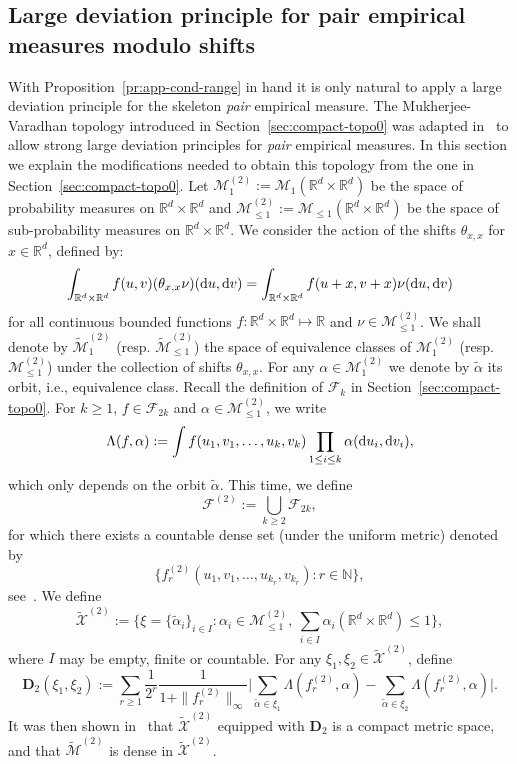 \documentclass[a4paper,11pt]{amsart}
\numberwithin{equation}{section}
\newcommand{\bbN}{{\ensuremath{\mathbb N}} }
\newcommand{\bbR}{{\ensuremath{\mathbb R}} }
\newcommand{\cF}{{\ensuremath{\mathcal F}} }
\newcommand{\cM}{{\ensuremath{\mathcal M}} }
\newcommand{\cX}{{\ensuremath{\mathcal X}} }
\newcommand{\ga}{\alpha}
\newcommand{\gt}{\theta}
\newcommand{\gL}{\Lambda}
\renewcommand{\tilde}{\widetilde}          %
\newcommand{\dd}{\text{\rm d}}             %
\newcommand{\8}{\infty}
\newcommand{\beq}{\begin{equation}}
\newcommand{\eeq}{\end{equation}}
\begin{document}
\subsection{Large deviation principle for pair empirical measures modulo shifts} 
\label{sec:pairLDP}
With Proposition~\ref{pr:app-cond-range} in hand it is only natural to apply a large deviation principle for the skeleton {\it pair} empirical measure. The Mukherjee-Varadhan topology introduced in Section~\ref{sec:compact-topo0} was adapted in~\cite{EP23} to allow strong large deviation principles for {\it pair} empirical measures. In this section we explain the modifications needed to obtain this topology from the one in Section~\ref{sec:compact-topo0}.
\noindent
Let $\cM_1^{(2)} := \cM_1(\bbR^d\times \bbR^d)$ be the space of probability measures on $\bbR^d\times \bbR^d$ and $\cM_{\le1}^{(2)} := \cM_{\le1}(\bbR^d\times \bbR^d)$ be the space of sub-probability measures on $\bbR^d\times \bbR^d$. We consider the action of the shifts $\gt_{x,x}$ for $x\in\bbR^d$, defined by:
\beq
\int_{\bbR^d\times \bbR^d} f(u,v) (\gt_{x,x} \nu)(\dd u,\dd v) = \int_{\bbR^d\times \bbR^d} f(u+x,v+x)  \nu(\dd u,\dd v)
\eeq
for all continuous bounded functions $f\colon \bbR^d\times \bbR^d \mapsto \bbR$ and $\nu\in \cM_{\le1}^{(2)}$. We shall denote by $\tilde \cM_1^{(2)}$ (resp. $\tilde \cM_{\le 1}^{(2)}$) the space of equivalence classes of $\cM_1^{(2)}$ (resp. $\cM_{\le 1}^{(2)}$) under the collection of shifts $\gt_{x,x}$. For any $\alpha\in \cM_1^{(2)}$ we denote by $\tilde\alpha$ its orbit, i.e., equivalence class. Recall the definition of $\cF_k$ in Section~\ref{sec:compact-topo0}. For $k\ge 1$, $f\in \cF_{2k}$ and $\ga \in \cM_{\le 1}^{(2)}$, we write
\beq
\label{eq:defLambda}
\gL(f, \ga) := \int f(u_1, v_1,\ldots, u_{k}, v_{k}) \prod_{1\le i\le k} \ga(\dd u_i, \dd v_i),
\eeq
which only depends on the orbit $\tilde \ga$. This time, we define
\beq
\cF^{(2)} := \bigcup_{k\ge 2} \cF_{2k},
\eeq
for which there exists a countable dense set (under the uniform metric) denoted by
\beq
\{f^{(2)}_r(u_1, v_1,\ldots, u_{k_r}, v_{k_r})\colon r\in \bbN\},
\eeq
see~\cite[Section 2.2]{MV2016}. We define
\beq
\tilde\cX^{(2)} := \Big\{
\xi = \{\tilde \ga_i\}_{i\in I} \colon \ga_i \in \cM_{\le 1}^{(2)},\ \sum_{i\in I} \ga_i(\bbR^d \times \bbR^d) \le 1\Big\},
\eeq
where $I$ may be empty, finite or countable. For any $\xi_1, \xi_2\in \tilde \cX^{(2)}$, define
\beq
\mathbf{D}_2(\xi_1, \xi_2) := \sum_{r\ge 1} \frac{1}{2^r} \frac{1}{1+\|f^{(2)}_r\|_{\infty}}
\Big|%
\sum_{\tilde\ga\in\xi_1} \gL(f^{(2)}_r, \ga)- \sum_{\tilde\ga\in\xi_2} \gL(f^{(2)}_r, \ga)
\Big|.%
\eeq
It was then shown in~\cite{EP23} that $\tilde\cX^{(2)}$ equipped with $\mathbf{D}_2$ is a compact metric space, and that $\tilde \cM^{(2)}$ is dense in $\tilde\cX^{(2)}$.\\
\end{document}
